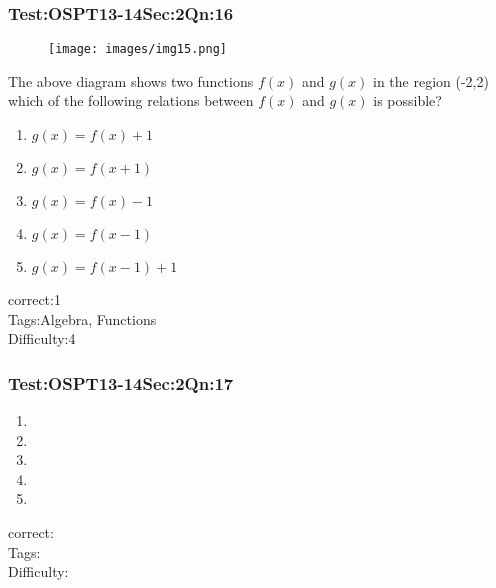 \documentclass[]{beamer}
\begin{document}
    \begin{frame}
	    \frametitle{Test:OSPT13-14\hspace{2mm}Sec:2\hspace{2mm}Qn:16}
	    \begin{figure}
	    \begin{center}
	   	\texttt{[image: images/img15.png]}
	    \end{center}
	    \end{figure}
	    The above diagram shows two functions $f(x)$ and $g(x)$ in the region (-2,2) which of the following relations between $f(x)$ and $g(x)$ is possible?
	   \begin{enumerate}
	        \item
	           $g(x)=f(x)+1$
	        \item
	           $g(x)=f(x+1)$ 
	        \item
	           $g(x)=f(x)-1$
	        \item
	            $g(x)=f(x-1)$
	        \item
	           $g(x)=f(x-1)+1$
	    \end{enumerate}
	    correct:1\\   
	    Tags:Algebra, Functions \\
	    Difficulty:4   \\
    \end{frame}    
    \begin{frame}
	    \frametitle{Test:OSPT13-14\hspace{2mm}Sec:2\hspace{2mm}Qn:17}
		    
	   \begin{enumerate}
	        \item
	           
	        \item
	            
	        \item
	           
	        \item
	            
	        \item
	           
	    \end{enumerate}
	    correct:\\   
	    Tags: \\
	    Difficulty:   \\
    \end{frame}    
\end{document}
